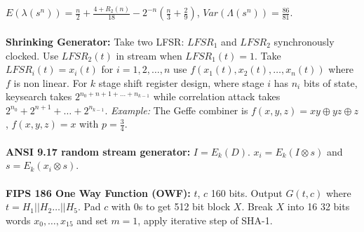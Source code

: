 $E(\lambda(s^n))= {\frac n 2} + {\frac {4+R_2(n)} {18}}- 2^{-n}({\frac n 3} + {\frac 2 9})$,
$Var(\Lambda(s^n))= {\frac {86} {81}}$.
\\
\\
{\bf Shrinking Generator:}  Take two LFSR: $LFSR_1$ and $LFSR_2$
synchronously clocked.  Use $LFSR_2(t)$ in stream when $LFSR_1(t)=1$.
Take $LFSR_i(t)= x_i(t)$ for $i=1,2, \ldots , n$
use $f(x_1(t), x_2(t) , \ldots , x_n(t))$ where $f$ is non linear.  For $k$ stage
shift register design, where stage $i$ has $n_i$ bits of state, keysearch takes
$2^{n_0 + n+1 + \ldots + n_{k-1}}$ while correlation attack takes
$2^{n_0} + 2^{n+1} + \ldots + 2^{n_{k-1}}$.
\emph{Example:}
The Geffe combiner is
$f(x,y,z)= xy \oplus yz \oplus z$, $f(x,y,z)=x$ with $p={\frac 3 4}$. 
\\
\\
{\bf ANSI 9.17 random stream generator:}
$I=E_k(D)$.
$x_i= E_k(I \otimes s)$ and
$s= E_k(x_i \otimes s)$.
\\
\\
{\bf FIPS 186 One Way Function (OWF):} $t$, $c$ 160 bits.  Output $G(t,c)$ where
$t= H_1 || H_2 \ldots || H_5$.  Pad $c$ with $0$s to get 512 bit
block $X$.  Break $X$ into 16 32 bits words $x_0, \ldots, x_{15}$ and
set $m= 1$, apply iterative step of SHA-1.

